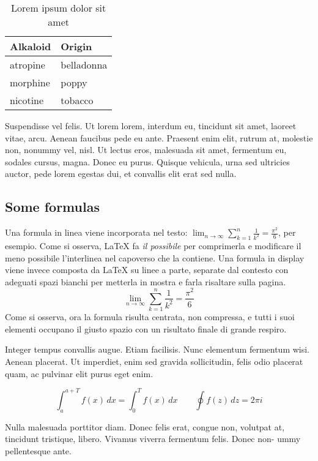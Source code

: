 \begin{table}
\caption{Lorem ipsum dolor sit amet}
\centering
\begin{tabular}{ll}
\toprule
\textbf{Alkaloid} & \textbf{Origin} \\
\midrule
atropine & belladonna \\
morphine & poppy \\
nicotine & tobacco \\
\bottomrule
\end{tabular}
\end{table}

Suspendisse vel felis. Ut lorem lorem, interdum eu, tincidunt sit amet, laoreet vitae, arcu. Aenean faucibus pede eu ante. Praesent enim elit, rutrum at, molestie non, nonummy vel, nisl. Ut lectus eros, malesuada sit amet, fermentum eu, sodales cursus, magna. Donec eu purus. Quisque vehicula, urna sed ultricies auctor, pede lorem egestas dui, et convallis elit erat sed nulla.

\subsection*{Some formulas}

Una formula in linea viene incorporata nel testo: $\lim_{n \to \infty}\sum_{k=1}^n \frac{1}{k^2} = \frac{\pi^2}{6}$, per esempio. Come si osserva, \LaTeX{} fa \emph{il possibile} per comprimerla e modificare il meno possibile l'interlinea nel capoverso che la contiene.
Una formula in display viene invece composta da \LaTeX{} su linee a parte, separate dal contesto con adeguati spazi bianchi per metterla in mostra e farla risaltare sulla pagina.
\begin{equation}
\lim_{n \to \infty}\sum_{k=1}^n \frac{1}{k^2}= \frac{\pi^2}{6}
\end{equation}
Come si osserva, ora la formula risulta centrata, non compressa, e tutti i suoi elementi occupano il giusto spazio con un risultato finale di grande respiro.

Integer tempus convallis augue. Etiam facilisis. Nunc elementum fermentum wisi. Aenean placerat. Ut imperdiet, enim sed gravida sollicitudin, felis odio placerat quam, ac pulvinar elit purus eget enim.

\begin{equation}
\int_a^{a+T}f(x)\,dx= \int_0^T f(x)\,dx
\qquad
\oint f(z)\,dz=2\pi i
\end{equation}

Nulla malesuada porttitor diam. Donec felis erat, congue non, volutpat at, tincidunt tristique, libero. Vivamus viverra fermentum felis. Donec non- ummy pellentesque ante.

